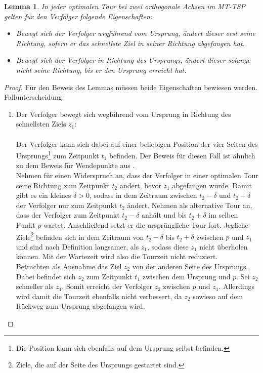 \documentclass[german,version-2019-11]{uzl-thesis}
\newtheorem{lem}{Lemma}
\begin{document}
\begin{lem}
\label{lem:2}
In jeder optimalen Tour bei zwei orthogonale Achsen im MT-TSP gelten für den Verfolger folgende Eigenschaften:
\begin{itemize}
\item
Bewegt sich der Verfolger wegführend vom Ursprung, ändert dieser erst seine Richtung, sofern er das schnellste Ziel in seiner Richtung abgefangen hat.
\item
Bewegt sich der Verfolger in Richtung des Ursprungs, ändert dieser solange nicht seine Richtung, bis er den Ursprung erreicht hat.
\end{itemize}
\end{lem}

\begin{proof}
Für den Beweis des Lemmas müssen beide Eigenschaften bewiesen werden.\\
Fallunterscheidung:
\begin{enumerate}
\item 
Der Verfolger bewegt sich wegführend vom Ursprung in Richtung des schnellsten Ziels $z_1$: \\\\
\noindent
Der Verfolger kann sich dabei auf einer beliebigen Position der vier Seiten des Ursprungs\footnote{Die Position kann sich ebenfalls auf dem Ursprung selbst befinden.} zum Zeitpunkt $t_1$ befinden. Der Beweis für diesen Fall ist ähnlich zu dem Beweis für Wendepunkte aus \cite{helvig}.\\
Nehmen für einen Widerspruch an, dass der Verfolger in einer optimalen Tour seine Richtung zum Zeitpunkt $t_2$ ändert, bevor $z_1$ abgefangen wurde. Damit gibt es ein kleines $\delta>0$, sodass in dem Zeitraum zwischen $t_2-\delta$ und $t_2+\delta$ der Verfolger nur zum Zeitpunkt $t_2$ ändert. Nehmen als alternative Tour an, dass der Verfolger zum Zeitpunkt $t_2-\delta$ anhält und bis $t_2+\delta$ im selben Punkt $p$ wartet. Anschließend setzt er die ursprüngliche Tour fort. Jegliche Ziele\footnote{Ziele, die auf der Seite des Ursprungs gestartet sind.} befinden sich in dem Zeitraum von $t_2-\delta$ bis $t_2+\delta$ zwischen $p$ und $z_1$ und sind nach Definition langsamer, als $z_1$, sodass diese $z_1$ nicht überholen können. Mit der Wartezeit wird also die Tourzeit nicht reduziert.\\
Betrachten als Ausnahme das Ziel $z_2$ von der anderen Seite des Ursprungs. Dabei befindet sich  $z_2$ zum Zeitpunkt $t_1$ zwischen dem Ursprung und $p$. Sei $z_2$ schneller als $z_1$. Somit erreicht der Verfolger $z_2$ zwischen $p$ und $z_1$. Allerdings wird damit die Tourzeit ebenfalls nicht verbessert, da $z_2$ sowieso auf dem Rückweg zum Ursprung abgefangen wird. \\

\end{enumerate}
\end{proof}
\end{document}
